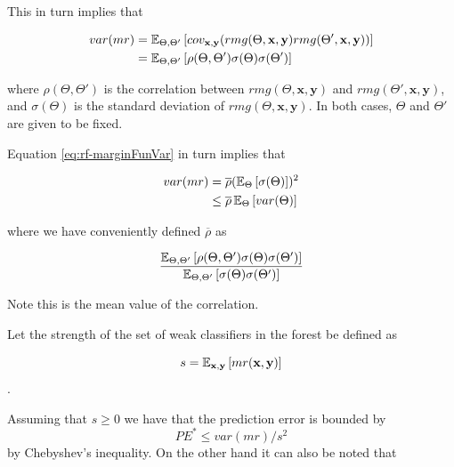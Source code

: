 This in turn implies that

\begin{equation}\label{eq:rf-marginFunVar}
\begin{split}
var(mr) & =  \operatorname{\mathbb{E}}_{\Theta, \Theta'}
\left[
cov_{\textbf{x},\textbf{y}}
(rmg(\Theta,\textbf{x},\textbf{y} )rmg(\Theta',\textbf{x},\textbf{y} ))
\right] \\
& =  \operatorname{\mathbb{E}}_{\Theta, \Theta'}
\left[
\rho(\Theta, \Theta')\sigma(\Theta)\sigma(\Theta')
\right]
\end{split}
\end{equation}

where $ \rho(\Theta, \Theta')$ is the correlation between $rmg(\Theta,\textbf{x},\textbf{y})$ and $rmg(\Theta',\textbf{x},\textbf{y})$, and $\sigma(\Theta)$ is the standard deviation of $rmg(\Theta,\textbf{x},\textbf{y})$. In both cases, $\Theta$ and $\Theta'$ are given to be fixed.

Equation \ref{eq:rf-marginFunVar} in turn implies that

\begin{equation}\label{eq:rf-varianceBound}
\begin{split}
var(mr) & =  \overline{\rho} (\operatorname{\mathbb{E}}_{\Theta}\left[ \sigma(\Theta)\right] )^2 \\
& \leq  \overline{\rho} \operatorname{\mathbb{E}}_{\Theta} \left[ var(\Theta) \right]
\end{split}
\end{equation}

where we have conveniently defined $\overline{\rho}$ as

\begin{equation}\label{eq:rf-meanCorrelation}
\frac{\operatorname{\mathbb{E}}_{\Theta, \Theta'} \left[ \rho(\Theta, \Theta') \sigma(\Theta) \sigma(\Theta')\right]}
{\operatorname{\mathbb{E}}_{\Theta, \Theta'} \left[ \sigma(\Theta) \sigma(\Theta')\right]}
\end{equation}

Note this is the mean value of the correlation.

Let the strength of the set of weak classifiers in the forest be defined as

$$s =  \operatorname{\mathbb{E}}_{\textbf{x},\textbf{y}} \left[ mr(\textbf{x},\textbf{y} ) \right] $$.\label{eq:rf-strength}

Assuming that $s \geq 0$ we have that the prediction error is bounded by
\begin{equation}\label{eq:rf-predictiveErrorBound1}
PE^* \leq var(mr)/s^2
\end{equation}
by Chebyshev's inequality. On the other hand it can also be noted that


